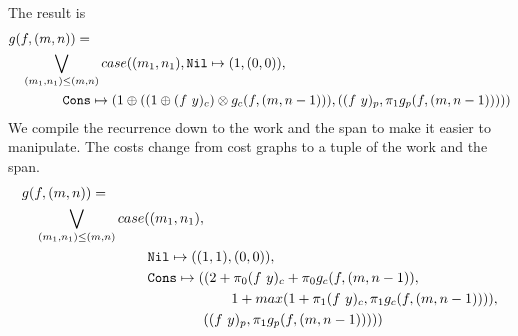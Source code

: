 %
The result is
%
\begin{equation*}
  \begin{split}
  &g(f, (m, n)) = \\
  &\quad \bigvee\limits_{(m_1, n_1) \leq (m, n)} case((m_1, n_1), \texttt{Nil} \mapsto (1, (0, 0)), \\
  &\qquad\quad\quad \texttt{Cons} \mapsto (1 \oplus ((1 \oplus (f\ y)_c) \otimes g_c(f, (m, n-1))), ((f\ y)_p, \pi_1 g_p(f, (m, n-1)))))
  \end{split}
\end{equation*}
%
%
We compile the recurrence down to the work and the span to make it easier to
manipulate.  The costs change from cost graphs to a tuple of the work and the
span.
%
\begin{equation*}
  \begin{split}
  &g(f, (m, n)) = \\
  &\quad \bigvee\limits_{(m_1, n_1) \leq (m, n)} case((m_1, n_1), \\
  &\qquad\quad\quad\quad\qquad\quad\quad \texttt{Nil} \mapsto ((1, 1), (0, 0)), \\
  &\qquad\quad\quad\quad\qquad\quad\quad \texttt{Cons} \mapsto ((2 + \pi_0(f\ y)_c + \pi_0 g_c(f, (m, n-1)), \\
  &\qquad\quad\quad\quad\qquad\quad\quad\quad\qquad\quad\quad\quad                     1 + max(1 + \pi_1(f\ y)_c, \pi_1 g_c(f, (m, n-1)))), \\
  &\qquad\quad\quad\quad\qquad\quad\quad\quad\quad\quad\quad                  ((f\ y)_p, \pi_1 g_p(f, (m, n-1)))))
  \end{split}
\end{equation*}
